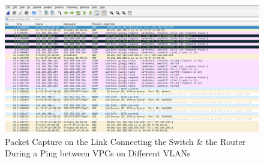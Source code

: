 \documentclass[a4paper]{article}
\begin{document}
\begin{figure}[H]
    \centering
    \includegraphics[width=\textwidth]{./images/eight.png}
    \caption{Packet Capture on the Link Connecting the Switch \& the Router During a Ping between VPCs on Different VLANs}
\end{figure}
\end{document}
